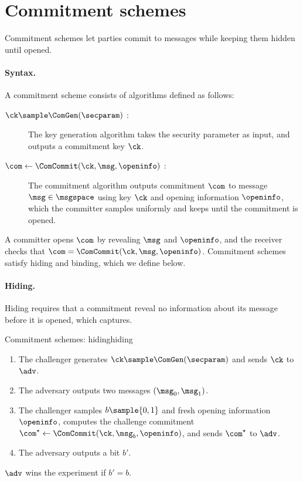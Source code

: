 \section{Commitment schemes}\label{sec:prelims-commitments}

Commitment schemes let parties commit to messages while keeping them hidden until
opened.

\paragraph{Syntax.} A commitment scheme consists of algorithms defined as
follows:
%
\begin{description}

  \item[$\ck \sample \ComGen(\secparam)$ :] The key generation algorithm
takes the security parameter as input, and outputs a commitment key $\ck$.

  \item[$\com \leftarrow \ComCommit(\ck, \msg, \openinfo)$ :] The commitment
algorithm outputs commitment $\com$ to message $\msg \in \msgspace$ using key $\ck$ and
opening information $\openinfo$, which the committer samples uniformly and keeps
until the commitment is opened.

\end{description}
%
A committer opens $\com$ by revealing $\msg$ and $\openinfo$, and the receiver
checks that $\com = \ComCommit(\ck, \msg, \openinfo)$. Commitment schemes
satisfy hiding and binding, which we define below.

\paragraph{Hiding.} Hiding requires that a commitment reveal no information
about its message before it is opened, which  captures.

\begin{experimentbox}{Commitment schemes: hiding}{hiding}

  \begin{enumerate}

    \item The challenger generates $\ck \sample \ComGen(\secparam)$ and sends
$\ck$ to $\adv$.

    \item The adversary outputs two messages $(\msg_0, \msg_1)$.

    \item The challenger samples $b \sample \{0,1\}$ and fresh opening
information $\openinfo$, computes the challenge commitment $\com^\star
\leftarrow \ComCommit(\ck, \msg_b, \openinfo)$, and sends
$\com^\star$ to $\adv$.

    \item The adversary outputs a bit $b'$.

  \end{enumerate}

  $\adv$ wins the experiment if $b' = b$.

\end{experimentbox}

